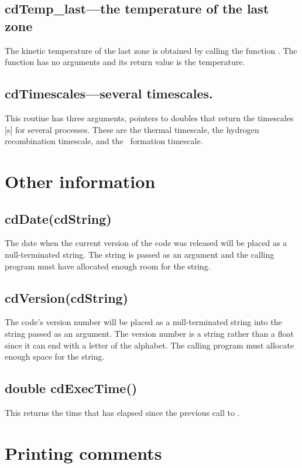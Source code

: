 \subsection{cdTemp\_last---the temperature of the last zone}

The kinetic temperature of the last zone is obtained by calling the
function .
The function has no arguments and its return value
is the temperature.

\subsection{cdTimescales---several timescales.}

This routine has three arguments, pointers to doubles that return the
timescales [s] for several processes.
These are the thermal timescale,
the hydrogen recombination timescale, and the \htwo\ formation timescale.

\section{Other information}

\subsection{cdDate(cdString)}

The date when the current version of the code was released will be placed
as a null-terminated string.  The string is passed as an argument and the
calling program must have allocated enough room for the string.

\subsection{cdVersion(cdString)}

The code's version number will be placed as a null-terminated string
into the string passed as an argument.
The version number is a string rather
than a float since it can end with a letter of the alphabet.
The calling
program must allocate enough space for the string.

\subsection{double cdExecTime()}

This returns the time that has elapsed since the previous call
to .

\section{Printing comments}

